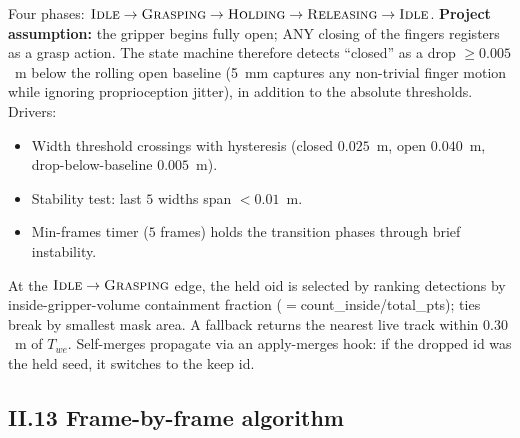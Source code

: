 \documentclass[11pt]{article}
\begin{document}
Four phases:
$\textsc{Idle}\to\textsc{Grasping}\to\textsc{Holding}\to\textsc{Releasing}\to\textsc{Idle}$.
\textbf{Project assumption:} the gripper begins fully open; ANY closing of
the fingers registers as a grasp action. The state machine therefore detects
``closed'' as a drop $\ge\!0.005$~m below the rolling open baseline (5~mm
captures any non-trivial finger motion while ignoring proprioception
jitter), in addition to the absolute thresholds. Drivers:
\begin{itemize}[leftmargin=1.5em,itemsep=0pt,topsep=2pt]
\item Width threshold crossings with hysteresis (closed $0.025$~m, open
  $0.040$~m, drop-below-baseline $0.005$~m).
\item Stability test: last $5$ widths span $<\!0.01$~m.
\item Min-frames timer ($5$ frames) holds the transition phases through
  brief instability.
\end{itemize}
At the $\textsc{Idle}\to\textsc{Grasping}$ edge, the held oid is selected
by ranking detections by inside-gripper-volume containment fraction
($=$count\_inside/total\_pts); ties break by smallest mask area. A fallback
returns the nearest live track within $0.30$~m of $T_{we}$. Self-merges
propagate via an apply-merges hook: if the dropped id was the held seed,
it switches to the keep id.

\subsection*{II.13 Frame-by-frame algorithm}
\end{document}
